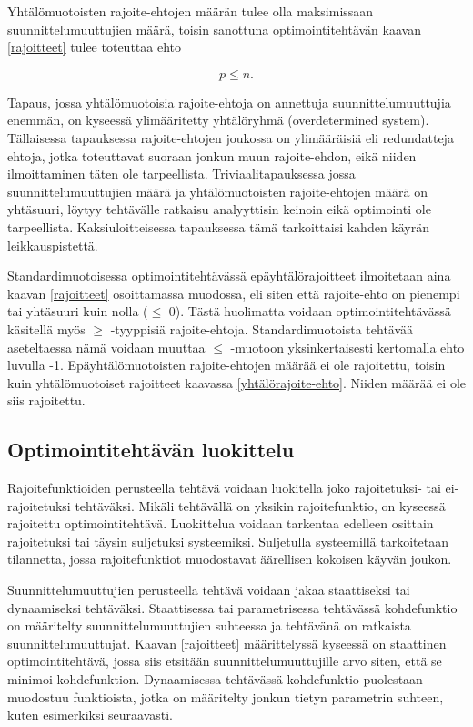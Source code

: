 \documentclass[12pt]{article}
\newenvironment{content}{\pagenumbering{arabic}}{}
\begin{document}
\begin{content}
Yhtälömuotoisten rajoite-ehtojen määrän tulee olla maksimissaan suunnittelumuuttujien määrä, toisin sanottuna optimointitehtävän kaavan \eqref{rajoitteet} tulee toteuttaa ehto

\begin{equation}
\label{yhtälörajoite-ehto}
p \leq n.
\end{equation}

Tapaus, jossa yhtälömuotoisia rajoite-ehtoja on annettuja suunnittelumuuttujia enemmän, on kyseessä ylimääritetty yhtälöryhmä (overdetermined system). Tällaisessa tapauksessa rajoite-ehtojen joukossa on ylimääräisiä eli redundatteja ehtoja, jotka toteuttavat suoraan jonkun muun rajoite-ehdon, eikä niiden ilmoittaminen täten ole tarpeellista. Triviaalitapauksessa jossa suunnittelumuuttujien määrä ja yhtälömuotoisten rajoite-ehtojen määrä on yhtäsuuri, löytyy tehtävälle ratkaisu analyyttisin keinoin eikä optimointi ole tarpeellista. Kaksiuloitteisessa tapauksessa tämä tarkoittaisi kahden käyrän leikkauspistettä. 

Standardimuotoisessa optimointitehtävässä epäyhtälörajoitteet ilmoitetaan aina kaavan \eqref{rajoitteet} osoittamassa muodossa, eli siten että rajoite-ehto on pienempi tai yhtäsuuri kuin nolla ($\leq$ 0). Tästä huolimatta voidaan optimointitehtävässä käsitellä myös $\geq$ -tyyppisiä rajoite-ehtoja. Standardimuotoista tehtävää aseteltaessa nämä voidaan muuttaa $\leq$ -muotoon yksinkertaisesti kertomalla ehto luvulla -1. Epäyhtälömuotoisten rajoite-ehtojen määrää ei ole rajoitettu, toisin kuin yhtälömuotoiset rajoitteet kaavassa \eqref{yhtälörajoite-ehto}. Niiden määrää ei ole siis rajoitettu.   \parencite[43]{intro}

\subsection{Optimointitehtävän luokittelu}


Rajoitefunktioiden perusteella tehtävä voidaan luokitella joko rajoitetuksi- tai ei-rajoitetuksi tehtäväksi. Mikäli tehtävällä on yksikin rajoitefunktio, on kyseessä rajoitettu optimointitehtävä. Luokittelua voidaan tarkentaa edelleen osittain rajoitetuksi tai täysin suljetuksi systeemiksi. Suljetulla systeemillä tarkoitetaan tilannetta, jossa rajoitefunktiot muodostavat äärellisen kokoisen käyvän joukon. 

Suunnittelumuuttujien perusteella tehtävä voidaan jakaa staattiseksi tai dynaamiseksi tehtäväksi. Staattisessa tai parametrisessa tehtävässä kohdefunktio on määritelty suunnittelumuuttujien suhteessa ja tehtävänä on ratkaista suunnittelumuuttujat. Kaavan \eqref{rajoitteet} määrittelyssä kyseessä on staattinen optimointitehtävä, jossa siis etsitään suunnittelumuuttujille arvo siten, että se minimoi kohdefunktion. Dynaamisessa tehtävässä kohdefunktio puolestaan muodostuu funktioista, jotka on määritelty jonkun tietyn parametrin suhteen, kuten esimerkiksi seuraavasti.


\end{content}
\end{document}
